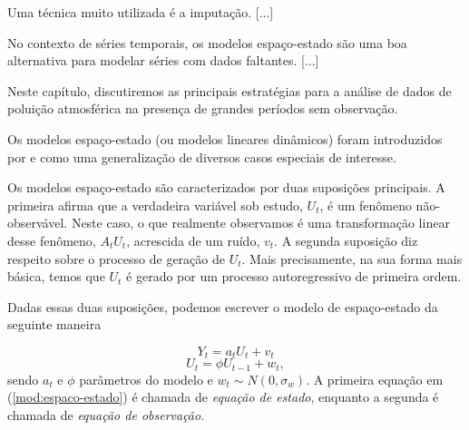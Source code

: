 Uma técnica muito utilizada é a imputação. [...]

No contexto de séries temporais, os modelos espaço-estado são uma boa alternativa para modelar séries com dados faltantes. [...]

Neste capítulo, discutiremos as principais estratégias para a análise de dados de poluição atmosférica na presença de grandes períodos sem observação.


Os modelos espaço-estado (ou modelos lineares dinâmicos) foram introduzidos por \cite{Kalman1960} e \cite{Kalman1961} como uma generalização de diversos casos especiais de interesse. 

Os modelos espaço-estado são caracterizados por duas suposições principais. A primeira afirma que a verdadeira variável sob estudo, $U_t$, é um fenômeno não-observável. Neste caso, o que realmente observamos é uma transformação linear desse fenômeno, $A_tU_t$, acrescida de um ruído, $v_t$. A segunda suposição diz respeito sobre o processo de geração de $U_t$. Mais precisamente, na sua forma mais básica, temos que $U_t$ é gerado por um processo autoregressivo de primeira ordem.

Dadas essas duas suposições, podemos escrever o modelo de espaço-estado da seguinte maneira

\begin{displaymath}
Y_t = a_tU_t + v_t
\end{displaymath}
\begin{equation}
U_t = \phi U_{t-1} + w_t,
\label{mod:espaco-estado}
\end{equation}
sendo $a_t$ e $\phi$ parâmetros do modelo e $w_t \sim N(0, \sigma_w)$. A primeira equação em (\ref{mod:espaco-estado}) é chamada de \textit{equação de estado}, enquanto a segunda é chamada de \textit{equação de observação}. 
